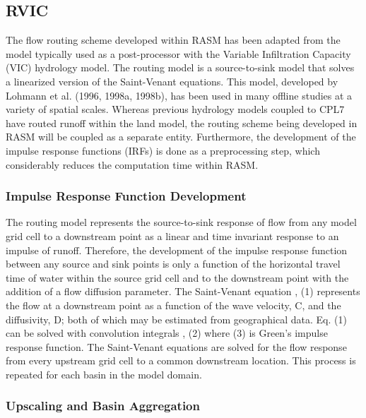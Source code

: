\subsection{RVIC}

The flow routing scheme developed within RASM has been adapted from the model typically used as a post-processor with the Variable Infiltration Capacity (VIC) hydrology model. The routing model is a source-to-sink model that solves a linearized version of the Saint-Venant equations. This model, developed by Lohmann et al. (1996, 1998a, 1998b), has been used in many offline studies at a variety of spatial scales.  Whereas previous hydrology models coupled to CPL7 have routed runoff within the land model, the routing scheme being developed in RASM will be coupled as a separate entity. Furthermore, the development of the impulse response functions (IRFs) is done as a preprocessing step, which considerably reduces the computation time within RASM.

\subsubsection{Impulse Response Function Development}

The routing model represents the source-to-sink response of flow from any model grid cell to a downstream point as a linear and time invariant response to an impulse of runoff.  Therefore, the development of the impulse response function between any source and sink points is only a function of the horizontal travel time of water within the source grid cell and to the downstream point with the addition of a flow diffusion parameter.  The Saint-Venant equation
,							(1)
represents the flow at a downstream point as a function of the wave velocity, C, and the diffusivity, D; both of which may be estimated from geographical data.  Eq. (1) can be solved with convolution integrals
,						(2)	
where
						(3)
is Green’s impulse response function.  The Saint-Venant equations are solved for the flow response from every upstream grid cell to a common downstream location.  This process is repeated for each basin in the model domain.

\subsubsection{Upscaling and Basin Aggregation}

